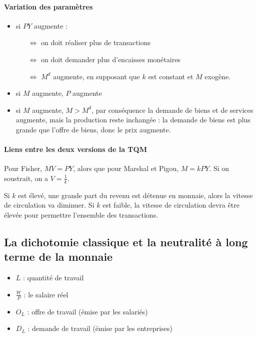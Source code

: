 	\paragraph{Variation des paramètres}
	
	\begin{itemize}
		\item si $PY$ augmente :
		
		\begin{itemize}
			\item[$\Leftrightarrow$] on doit réaliser plus de transactions
			\item[$\Leftrightarrow$] on doit demander plus d'encaisses monétaires
			\item[$\Leftrightarrow$] $M^d$ augmente, en supposant que $k$ est constant et $M$ exogène.
		\end{itemize}
		
		\item si $M$ augmente, $P$ augmente
		\item si $M$ augmente, $M > M^d$, par conséquence la demande de biens et de services augmente, mais la production reste inchangée : la demande de biens est plus grande que l'offre de biens, donc le prix augmente.
	\end{itemize}
	
	\paragraph{Liens entre les deux versions de la TQM}
	
	Pour Fisher, $MV = PY$, alors que pour Marshal et Pigou, $M = kPY$. Si on soustrait, on a $V = \frac{1}{k}$.
	
	Si $k$ est élevé, une grande part du revenu est détenue en monnaie, alors la vitesse de circulation va diminuer. Si $k$ est faible, la  vitesse de circulation devra être élevée pour permettre l'ensemble des transactions.
	
	\subsection{La dichotomie classique et la neutralité à long terme de la monnaie}
	
	
	\begin{itemize}
		\item $L$ : quantité de travail
		\item $\frac{W}{P}$ : le salaire réel
		\item $O_L$ : offre de travail (émise par les salariés)
		\item $D_L$ : demande de travail (émise par les entreprises)
	\end{itemize}
	
